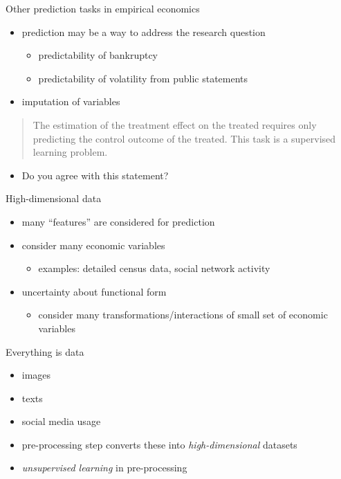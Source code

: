 \documentclass[xcolor=dvipsnames]{beamer}
\begin{document}
\begin{frame}{Other prediction tasks in empirical economics}
\begin{itemize}
  \item 
  prediction may be a way to address the research question
  \begin{itemize}
    \item predictability of bankruptcy \parencite{becerra2005neural}
    \item predictability of volatility from public statements \parencite{kogan2009predicting}
  \end{itemize}
  \item 
  imputation of variables
\end{itemize}
\pause
\begin{quote}
The estimation of the treatment effect on the treated requires only predicting the control outcome of the treated. 
This task is a supervised learning problem.
\end{quote}
\begin{itemize}
  \item Do you agree with this statement?
\end{itemize}
\end{frame}


\begin{frame}{High-dimensional data}
\begin{itemize}
  \item many ``features'' are considered for prediction
  \item consider many economic variables 
  \begin{itemize}
    \item examples: detailed census data, social network activity
  \end{itemize}
  \item uncertainty about functional form 
  \begin{itemize}
    \item consider many transformations/interactions of small set of economic variables
  \end{itemize}
\end{itemize}
\end{frame}


\begin{frame}{Everything is data}
\begin{itemize}
  \item images 
  \item texts 
  \item social media usage 
  \item pre-processing step converts these into \emph{high-dimensional} datasets
  \item \emph{unsupervised learning} in pre-processing  
\end{itemize}
\end{frame}
\end{document}
